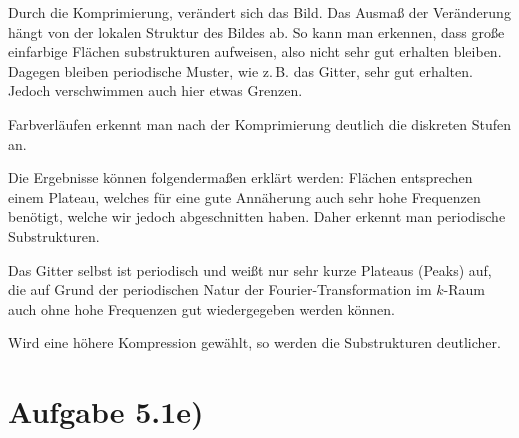 Durch die Komprimierung, verändert sich das Bild. Das Ausmaß der Veränderung
hängt von der lokalen Struktur des Bildes ab. So kann man erkennen, dass
große einfarbige Flächen substrukturen aufweisen, also nicht sehr gut erhalten
bleiben. Dagegen bleiben periodische Muster, wie z.\,B. das Gitter, sehr gut
erhalten. Jedoch verschwimmen auch hier etwas Grenzen.

Farbverläufen erkennt man nach der Komprimierung deutlich die diskreten Stufen an.

Die Ergebnisse können folgendermaßen erklärt werden: Flächen entsprechen einem Plateau,
welches für eine gute Annäherung auch sehr hohe Frequenzen benötigt, welche wir jedoch
abgeschnitten haben. Daher erkennt man periodische Substrukturen.

Das Gitter selbst ist periodisch und weißt nur sehr kurze Plateaus (Peaks) auf, die auf Grund
der periodischen Natur der Fourier-Transformation im $k$-Raum auch ohne hohe Frequenzen
gut wiedergegeben werden können.

Wird eine höhere Kompression gewählt, so werden die Substrukturen deutlicher.



\section*{Aufgabe 5.1e)}